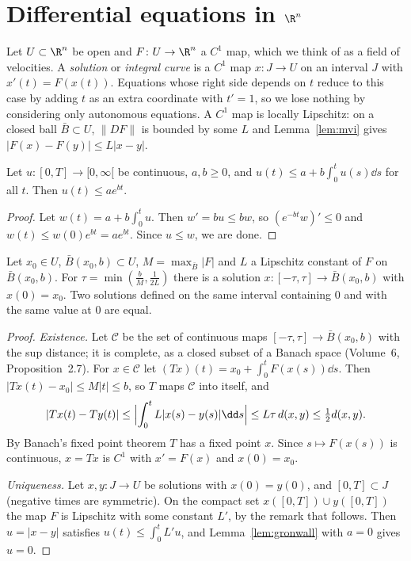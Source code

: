 \section{Differential equations in \texorpdfstring{$\R^n$}{R\^{}n}}

Let $U\subset\R^n$ be open and $F\colon U\to\R^n$ a $C^1$ map, which we think of as a field of velocities. A \emph{solution} or \emph{integral curve}
is a $C^1$ map $x\colon J\to U$ on an interval $J$ with $x'(t)=F(x(t))$. Equations whose right side depends on $t$ reduce to this case by adding $t$ as
an extra coordinate with $t'=1$, so we lose nothing by considering only autonomous equations. A $C^1$ map is locally Lipschitz: on a closed ball
$\bar B\subset U$, $\|DF\|$ is bounded by some $L$ and Lemma~\ref{lem:mvi} gives $|F(x)-F(y)|\le L|x-y|$.

\begin{lemma}[Gr\"onwall]\label{lem:gronwall}
Let $u\colon[0,T]\to[0,\infty[$ be continuous, $a,b\ge0$, and $u(t)\le a+b\int_0^tu(s)\dd s$ for all $t$. Then $u(t)\le ae^{bt}$.
\end{lemma}
\begin{proof}
Let $w(t)=a+b\int_0^tu$. Then $w'=bu\le bw$, so $(e^{-bt}w)'\le0$ and $w(t)\le w(0)e^{bt}=ae^{bt}$. Since $u\le w$, we are done.
\end{proof}

\begin{theorem}\label{thm:picard}
Let $x_0\in U$, $\bar B(x_0,b)\subset U$, $M=\max_{\bar B}|F|$ and $L$ a Lipschitz constant of $F$ on $\bar B(x_0,b)$. For $\tau=\min(\frac bM,\frac1{2L})$
there is a solution $x\colon[-\tau,\tau]\to\bar B(x_0,b)$ with $x(0)=x_0$. Two solutions defined on the same interval containing $0$ and with the same value
at $0$ are equal.
\end{theorem}
\begin{proof}
\emph{Existence.} Let $\mathcal C$ be the set of continuous maps $[-\tau,\tau]\to\bar B(x_0,b)$ with the sup distance; it is complete, as a closed subset of
a Banach space (Volume~6, Proposition~2.7). For $x\in\mathcal C$ let $(Tx)(t)=x_0+\int_0^tF(x(s))\dd s$. Then $|Tx(t)-x_0|\le M|t|\le b$, so $T$ maps
$\mathcal C$ into itself, and
\[
|Tx(t)-Ty(t)|\le\Bigl|\int_0^tL|x(s)-y(s)|\dd s\Bigr|\le L\tau\,d(x,y)\le\tfrac12d(x,y).
\]
By Banach's fixed point theorem $T$ has a fixed point $x$. Since $s\mapsto F(x(s))$ is continuous, $x=Tx$ is $C^1$ with $x'=F(x)$ and $x(0)=x_0$.

\emph{Uniqueness.} Let $x,y\colon J\to U$ be solutions with $x(0)=y(0)$, and $[0,T]\subset J$ (negative times are symmetric). On the compact set
$x([0,T])\cup y([0,T])$ the map $F$ is Lipschitz with some constant $L'$, by the remark that follows. Then $u=|x-y|$ satisfies $u(t)\le\int_0^tL'u$, and Lemma~\ref{lem:gronwall} with $a=0$ gives $u=0$.
\end{proof}


